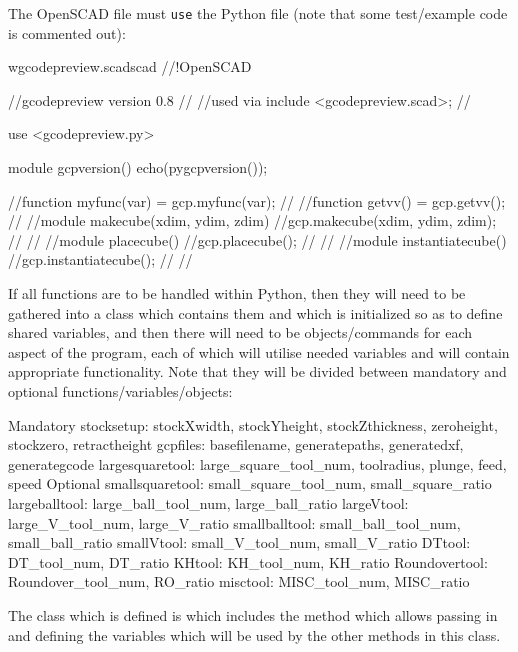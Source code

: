 \documentclass{ltxdoc}
\begin{document}
The OpenSCAD file must \verb|use| the Python file (note that some test/example code is commented out):

\begin{writecode}{w}{gcodepreview.scad}{scad}
//!OpenSCAD
 
//gcodepreview version 0.8
//
//used via include <gcodepreview.scad>;
//

use <gcodepreview.py>

module gcpversion(){
echo(pygcpversion());
}

//function myfunc(var) = gcp.myfunc(var);
//
//function getvv() = gcp.getvv();
//
//module makecube(xdim, ydim, zdim){
//gcp.makecube(xdim, ydim, zdim);
//}
//
//module placecube(){
//gcp.placecube();
//}
//
//module instantiatecube(){
//gcp.instantiatecube();
//}
//
\end{writecode}
\addtocounter{gcpscad}{29}

If all functions are to be handled within Python, then they will need to be gathered into a class which contains them and which is initialized so as to define shared variables, and then there will need to be objects/commands for each aspect of the program, each of which will utilise needed variables and will contain appropriate functionality. Note that they will be divided between mandatory and optional functions/variables/objects:

\begin{outline}
\1 Mandatory
   \2 stocksetup:
      \3 stockXwidth, stockYheight, stockZthickness, zeroheight, stockzero, retract\-height
   \2 gcpfiles: 
      \3 basefilename, generatepaths, generatedxf, generategcode
   \2 largesquaretool: 
      \3 large\_square\_tool\_num, toolradius, plunge, feed, speed
\1 Optional
   \2 smallsquaretool: 
      \3small\_square\_tool\_num, small\_square\_ratio
   \2 largeballtool: 
      \3 large\_ball\_tool\_num, large\_ball\_ratio
   \2 largeVtool: 
      \3 large\_V\_tool\_num, large\_V\_ratio
   \2 smallballtool: 
      \3 small\_ball\_tool\_num, small\_ball\_ratio
   \2 smallVtool: 
      \3 small\_V\_tool\_num, small\_V\_ratio
   \2 DTtool: 
      \3 DT\_tool\_num, DT\_ratio
   \2 KHtool: 
      \3 KH\_tool\_num, KH\_ratio
   \2 Roundovertool: 
      \3 Roundover\_tool\_num, RO\_ratio
   \2 misctool: 
      \3 MISC\_tool\_num, MISC\_ratio
\end{outline}

The class which is defined is  which includes the  method which allows passing in and defining the variables which will be used by the other methods in this class.
\end{document}
